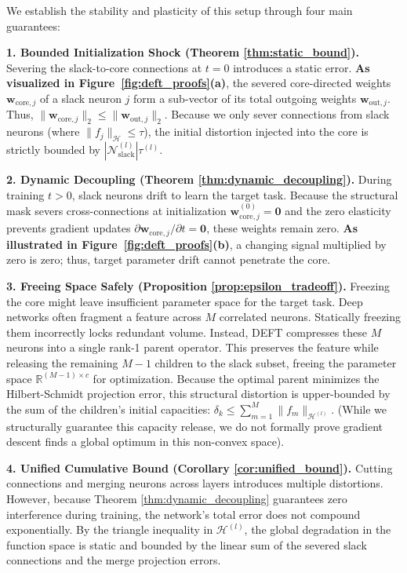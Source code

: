 \documentclass[11pt, a4paper, copyright, gdm]{google}
\newcommand{\wVect}{\boldsymbol{w}}
\newcommand{\zeroVect}{\boldsymbol{0}}
\newcommand{\calH}{\mathcal{H}}
\newcommand{\calN}{\mathcal{N}}
\theoremstyle{definition}
\begin{document}
We establish the stability and plasticity of this setup through four main guarantees:

\textbf{1. Bounded Initialization Shock (Theorem \ref{thm:static_bound}).} 
Severing the slack-to-core connections at $t=0$ introduces a static error. \textbf{As visualized in Figure~\ref{fig:deft_proofs}(a)}, the severed core-directed weights $\wVect_{\text{core},j}$ of a slack neuron $j$ form a sub-vector of its total outgoing weights $\wVect_{\text{out},j}$. Thus, $\|\wVect_{\text{core},j}\|_2 \le \|\wVect_{\text{out},j}\|_2$. Because we only sever connections from slack neurons (where $\|f_j\|_{\calH} \le \tau$), the initial distortion injected into the core is strictly bounded by $|\calN_{\text{slack}}^{(l)}| \tau^{(l)}$.

\textbf{2. Dynamic Decoupling (Theorem \ref{thm:dynamic_decoupling}).} 
During training $t>0$, slack neurons drift to learn the target task. Because the structural mask severs cross-connections at initialization $\wVect_{\text{core},j}^{(0)} = \zeroVect$ and the zero elasticity prevents gradient updates $\partial \wVect_{\text{core},j} / \partial t = \zeroVect$, these weights remain zero. \textbf{As illustrated in Figure~\ref{fig:deft_proofs}(b)}, a changing signal multiplied by zero is zero; thus, target parameter drift cannot penetrate the core.

\textbf{3. Freeing Space Safely (Proposition \ref{prop:epsilon_tradeoff}).} 
Freezing the core might leave insufficient parameter space for the target task. Deep networks often fragment a feature across $M$ correlated neurons. Statically freezing them incorrectly locks redundant volume. Instead, DEFT compresses these $M$ neurons into a single rank-1 parent operator. This preserves the feature while releasing the remaining $M-1$ children to the slack subset, freeing the parameter space $\mathbb{R}^{(M-1) \times c}$ for optimization. Because the optimal parent minimizes the Hilbert-Schmidt projection error, this structural distortion is upper-bounded by the sum of the children's initial capacities: $\delta_k \le \sum_{m=1}^M \|f_m\|_{\calH^{(l)}}$. (While we structurally guarantee this capacity release, we do not formally prove gradient descent finds a global optimum in this non-convex space).

\textbf{4. Unified Cumulative Bound (Corollary \ref{cor:unified_bound}).} 
Cutting connections and merging neurons across layers introduces multiple distortions. However, because Theorem \ref{thm:dynamic_decoupling} guarantees zero interference during training, the network's total error does not compound exponentially. By the triangle inequality in $\calH^{(l)}$, the global degradation in the function space is static and bounded by the linear sum of the severed slack connections and the merge projection errors.
\end{document}
